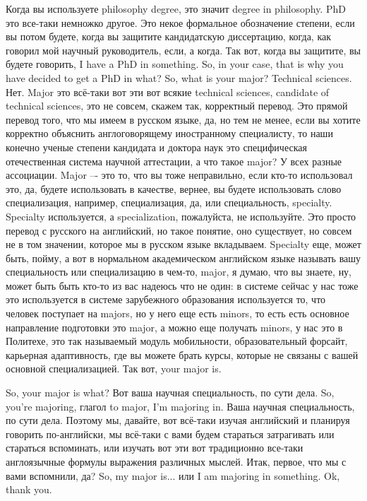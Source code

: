 \documentclass[main.tex]{subfiles}
\begin{document}
Когда вы используете philosophy degree, это значит degree in philosophy.
PhD это все-таки немножко другое.
Это некое формальное обозначение степени, если вы потом будете, когда вы защитите кандидатскую диссертацию, когда, как говорил мой научный руководитель, если, а когда.
Так вот, когда вы защитите, вы будете говорить, I have a PhD in something.
So, in your case, that is why you have decided to get a PhD in what? So, what is your major? Technical sciences.
Нет.
Major это всё-таки вот эти вот всякие technical sciences, candidate of technical sciences, это не совсем, скажем так, корректный перевод.
Это прямой перевод того, что мы имеем в русском языке, да, но тем не менее, если вы хотите корректно объяснить англоговорящему иностранному специалисту, то наши конечно ученые степени кандидата и доктора наук это специфическая отечественная система научной аттестации, а что такое major? У всех разные ассоциации.
Major –- это то, что вы тоже неправильно, если кто-то использовал это, да, будете использовать в качестве, вернее, вы будете использовать слово специализация, например, специализация, да, или специальность, specialty.
Specialty используется, а specialization, пожалуйста, не используйте.
Это просто перевод с русского на английский, но такое понятие, оно существует, но совсем не в том значении, которое мы в русском языке вкладываем.
Specialty еще, может быть, пойму, а вот в нормальном академическом английском языке называть вашу специальность или специализацию в чем-то, major, я думаю, что вы знаете, ну, может быть быть кто-то из вас надеюсь что не один: в системе сейчас у нас тоже это используется в системе зарубежного образования используется то, что человек поступает на majors, но у него еще есть minors, то есть есть основное направление подготовки это major, а можно еще получать minors, у нас это в Политехе, это так называемый модуль мобильности, образовательный форсайт, карьерная адаптивность, где вы можете брать курсы, которые не связаны с вашей основной специализацией.
Так вот, your major is.

So, your major is what? Вот ваша научная специальность, по сути дела.
So, you're majoring, глагол to major, I'm majoring in.
Ваша научная специальность, по сути дела.
Поэтому мы, давайте, вот всё-таки изучая английский и планируя говорить по-английски, мы всё-таки с вами будем стараться затрагивать или стараться вспоминать, или изучать вот эти вот традиционно все-таки англоязычные формулы выражения различных мыслей.
Итак, первое, что мы с вами вспомнили, да?
So, my major is... или I am majoring in something.
Ok, thank you.
\end{document}
